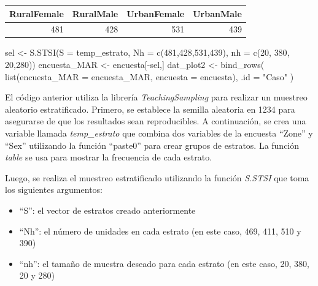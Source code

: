 \documentclass[
  12pt,
]{book}
\newenvironment{Shaded}{\begin{snugshade}}{\end{snugshade}}
\newcommand{\AttributeTok}[1]{\textcolor[rgb]{0.77,0.63,0.00}{#1}}
\newcommand{\DecValTok}[1]{\textcolor[rgb]{0.00,0.00,0.81}{#1}}
\newcommand{\FunctionTok}[1]{\textcolor[rgb]{0.00,0.00,0.00}{#1}}
\newcommand{\NormalTok}[1]{#1}
\newcommand{\OtherTok}[1]{\textcolor[rgb]{0.56,0.35,0.01}{#1}}
\newcommand{\SpecialCharTok}[1]{\textcolor[rgb]{0.00,0.00,0.00}{#1}}
\newcommand{\StringTok}[1]{\textcolor[rgb]{0.31,0.60,0.02}{#1}}
\providecommand{\tightlist}{%
  \setlength{\itemsep}{0pt}\setlength{\parskip}{0pt}}
\begin{document}
\begin{tabular}{r|r|r|r}
\hline
RuralFemale & RuralMale & UrbanFemale & UrbanMale\\
\hline
481 & 428 & 531 & 439\\
\hline
\end{tabular}

\begin{Shaded}
\begin{Highlighting}[]
\NormalTok{sel }\OtherTok{\textless{}{-}} \FunctionTok{S.STSI}\NormalTok{(}\AttributeTok{S =}\NormalTok{ temp\_estrato, }
              \AttributeTok{Nh =} \FunctionTok{c}\NormalTok{(}\DecValTok{481}\NormalTok{,}\DecValTok{428}\NormalTok{,}\DecValTok{531}\NormalTok{,}\DecValTok{439}\NormalTok{),}
              \AttributeTok{nh =} \FunctionTok{c}\NormalTok{(}\DecValTok{20}\NormalTok{, }\DecValTok{380}\NormalTok{, }\DecValTok{20}\NormalTok{,}\DecValTok{280}\NormalTok{))}
\NormalTok{encuesta\_MAR }\OtherTok{\textless{}{-}}\NormalTok{ encuesta[}\SpecialCharTok{{-}}\NormalTok{sel,]}
\NormalTok{dat\_plot2 }\OtherTok{\textless{}{-}} \FunctionTok{bind\_rows}\NormalTok{(}
  \FunctionTok{list}\NormalTok{(}\AttributeTok{encuesta\_MAR =}\NormalTok{ encuesta\_MAR,}
       \AttributeTok{encuesta =}\NormalTok{ encuesta), }\AttributeTok{.id =} \StringTok{"Caso"}\NormalTok{  )}
\end{Highlighting}
\end{Shaded}

El código anterior utiliza la librería \emph{TeachingSampling} para realizar un muestreo aleatorio estratificado. Primero, se establece la semilla aleatoria en 1234 para asegurarse de que los resultados sean reproducibles. A continuación, se crea una variable llamada \emph{temp\_estrato} que combina dos variables de la encuesta ``Zone'' y ``Sex'' utilizando la función ``paste0'' para crear grupos de estratos. La función \emph{table} se usa para mostrar la frecuencia de cada estrato.

Luego, se realiza el muestreo estratificado utilizando la función \emph{S.STSI} que toma los siguientes argumentos:

\begin{itemize}
\tightlist
\item
  ``S'': el vector de estratos creado anteriormente
\item
  ``Nh'': el número de unidades en cada estrato (en este caso, 469, 411, 510 y 390)
\item
  ``nh'': el tamaño de muestra deseado para cada estrato (en este caso, 20, 380, 20 y 280)
\end{itemize}
\end{document}
